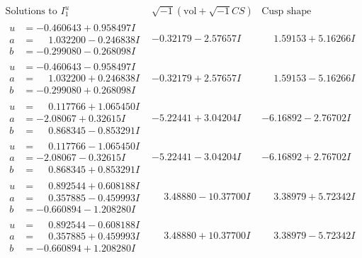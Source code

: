 \documentclass[1p]{elsarticle_modified}
\theoremstyle{definition}
\newcommand{\I}{\sqrt{-1}}
\begin{document}
$$\begin{array}{c|c|c}  
\text{Solutions to }I^u_{1}& \I (\text{vol} + \sqrt{-1}CS) & \text{Cusp shape}\\
 \hline 
\begin{aligned}
u &= -0.460643 + 0.958497 I \\
a &= \phantom{-}1.032200 - 0.246838 I \\
b &= -0.299080 - 0.268098 I\end{aligned}
 & -0.32179 - 2.57657 I & \phantom{-}1.59153 + 5.16266 I \\ \hline\begin{aligned}
u &= -0.460643 - 0.958497 I \\
a &= \phantom{-}1.032200 + 0.246838 I \\
b &= -0.299080 + 0.268098 I\end{aligned}
 & -0.32179 + 2.57657 I & \phantom{-}1.59153 - 5.16266 I \\ \hline\begin{aligned}
u &= \phantom{-}0.117766 + 1.065450 I \\
a &= -2.08067 + 0.32615 I \\
b &= \phantom{-}0.868345 - 0.853291 I\end{aligned}
 & -5.22441 + 3.04204 I & -6.16892 - 2.76702 I \\ \hline\begin{aligned}
u &= \phantom{-}0.117766 - 1.065450 I \\
a &= -2.08067 - 0.32615 I \\
b &= \phantom{-}0.868345 + 0.853291 I\end{aligned}
 & -5.22441 - 3.04204 I & -6.16892 + 2.76702 I \\ \hline\begin{aligned}
u &= \phantom{-}0.892544 + 0.608188 I \\
a &= \phantom{-}0.357885 - 0.459993 I \\
b &= -0.660894 - 1.208280 I\end{aligned}
 & \phantom{-}3.48880 - 10.37700 I & \phantom{-}3.38979 + 5.72342 I \\ \hline\begin{aligned}
u &= \phantom{-}0.892544 - 0.608188 I \\
a &= \phantom{-}0.357885 + 0.459993 I \\
b &= -0.660894 + 1.208280 I\end{aligned}
 & \phantom{-}3.48880 + 10.37700 I & \phantom{-}3.38979 - 5.72342 I \\ \hline\begin{aligned}

\end{aligned}
\end{array}$$
\end{document}
